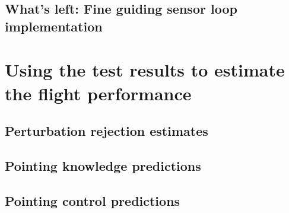 \subsection{What's left: Fine guiding sensor loop implementation}

\section{	Using the test results to estimate the flight performance}
\subsection{Perturbation rejection estimates}
\subsection{Pointing knowledge predictions}
\subsection{Pointing control predictions}

